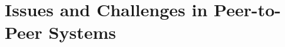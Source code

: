 
\section{Issues and Challenges in Peer-to-Peer Systems}
\label{sec:p2p-systems:issues}


%
%
%
%
%
%
%
